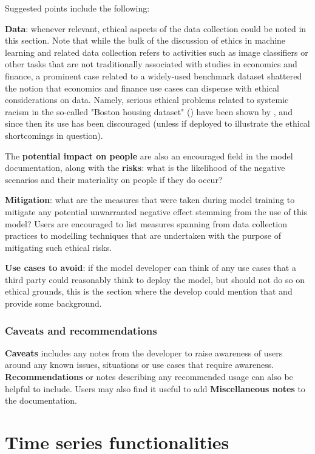 \documentclass{article}
\begin{document}
Suggested points include the following:

\textbf{Data}: whenever relevant, ethical aspects of the data collection could be noted in this section. Note that while the bulk of the discussion of ethics in machine learning and related data collection refers to activities such as image classifiers or other tasks that are not traditionally associated with studies in economics and finance, a prominent case related to a widely-used benchmark dataset shattered the notion that economics and finance use cases can dispense with ethical considerations on data. Namely, serious ethical problems related to systemic racism in the so-called "Boston housing dataset" (\cite{Boston}) have been shown by \cite{BostonHousingEthicsProblem}, and since then its use has been discouraged (unless if deployed to illustrate the ethical shortcomings in question).

The \textbf{potential impact on people} are also an encouraged field in the model documentation, along with the \textbf{risks}: what is the likelihood of the negative scenarios and their materiality on people if they do occur?

\textbf{Mitigation}: what are the measures that were taken during model training to mitigate any potential unwarranted negative effect stemming from the use of this model? Users are encouraged to list measures spanning from data collection practices to modelling techniques that are undertaken with the purpose of mitigating such ethical risks.

\textbf{Use cases to avoid}: if the model developer can think of any use cases that a third party could reasonably think to deploy the model, but should not do so on ethical grounds, this is the section where the develop could mention that and provide some background.

\subsubsection{Caveats and recommendations}

\textbf{Caveats} includes any notes from the developer to raise awareness of users around any known issues, situations or use cases that require awareness. \textbf{Recommendations} or notes describing any recommended usage can also be helpful to include. Users may also find it useful to add \textbf{Miscellaneous notes} to the documentation.

\section{Time series functionalities}
\end{document}
